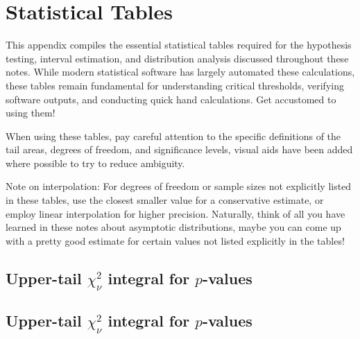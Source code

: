 \chapter{Statistical Tables}
This appendix compiles the essential statistical tables required for the hypothesis testing, interval estimation, and distribution analysis discussed throughout these notes. 
While modern statistical software has largely automated these calculations, these tables remain fundamental for understanding critical thresholds, verifying software outputs, and conducting quick hand calculations. Get accustomed to using them!

When using these tables, pay careful attention to the specific definitions of the tail areas, degrees of freedom, and significance levels, visual aids have been added where possible to try to reduce ambiguity.

Note on interpolation: For degrees of freedom or sample sizes not explicitly listed in these tables, use the closest smaller value for a conservative estimate, or employ linear interpolation for higher precision. Naturally, think of all you have learned in these notes about asymptotic distributions, maybe you can come up with a pretty good estimate for certain values not listed explicitly in the tables!

\clearpage

\section{\texorpdfstring{Upper-tail $\chi^2_\nu$ integral for $p$-values}{Upper-tail Chi-Squared integral for p-values}}

\begin{figure}[H]
	\centering
	
\end{figure}

\begin{table}[H]
	
\end{table}

\clearpage

\section*{\texorpdfstring{Upper-tail $\chi^2_\nu$ integral for $p$-values}{Upper-tail Chi-Squared integral for p-values}}

\begin{figure}[H]
	\centering
	
\end{figure}

